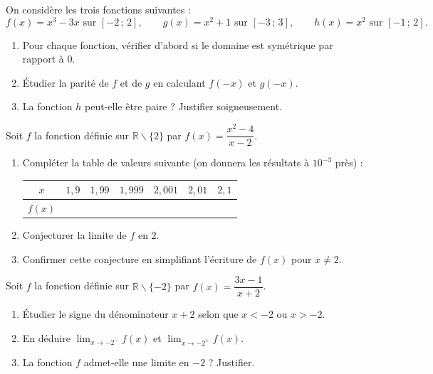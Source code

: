 \documentclass[11pt]{article}
\newcounter{popsec}
\newcounter{popsub}
\newcommand{\courssub}[1]{%
  \stepcounter{popsub}%
  \par\vspace{9pt}\noindent{\popxbold\fontsize{11.5}{13}\selectfont\color{popink}{\color{poporange}\thepopsec.\thepopsub}\hspace{6pt}#1}\par\nopagebreak\vspace{4pt}
}
\def\setminus{\mathbin{\backslash}}\let\smallsetminus\setminus
\begin{document}
\courssub{Je m'entraîne}

\begin{exercice}
On considère les trois fonctions suivantes :
\[ f(x)=x^3-3x \text{ sur } [-2\,;\,2], \qquad g(x)=x^2+1 \text{ sur } [-3\,;\,3], \qquad h(x)=x^2 \text{ sur } [-1\,;\,2]. \]
\begin{enumerate}
\item Pour chaque fonction, vérifier d'abord si le domaine est symétrique par rapport à $0$.
\item Étudier la parité de $f$ et de $g$ en calculant $f(-x)$ et $g(-x)$.
\item La fonction $h$ peut-elle être paire ? Justifier soigneusement.
\end{enumerate}
\end{exercice}

\begin{exercice}
Soit $f$ la fonction définie sur $\mathbb{R}\setminus\{2\}$ par $f(x)=\dfrac{x^2-4}{x-2}$.
\begin{enumerate}
\item Compléter la table de valeurs suivante (on donnera les résultats à $10^{-3}$ près) :
\begin{center}
\begin{tabular}{|c|cccccc|}\hline
$x$ & $1,9$ & $1,99$ & $1,999$ & $2,001$ & $2,01$ & $2,1$ \\ \hline
$f(x)$ & & & & & & \\ \hline
\end{tabular}
\end{center}
\item Conjecturer la limite de $f$ en $2$.
\item Confirmer cette conjecture en simplifiant l'écriture de $f(x)$ pour $x\neq 2$.
\end{enumerate}
\end{exercice}

\begin{exercice}
Soit $f$ la fonction définie sur $\mathbb{R}\setminus\{-2\}$ par $f(x)=\dfrac{3x-1}{x+2}$.
\begin{enumerate}
\item Étudier le signe du dénominateur $x+2$ selon que $x<-2$ ou $x>-2$.
\item En déduire $\displaystyle\lim_{x\to -2^-}f(x)$ et $\displaystyle\lim_{x\to -2^+}f(x)$.
\item La fonction $f$ admet-elle une limite en $-2$ ? Justifier.
\end{enumerate}
\end{exercice}
\end{document}
